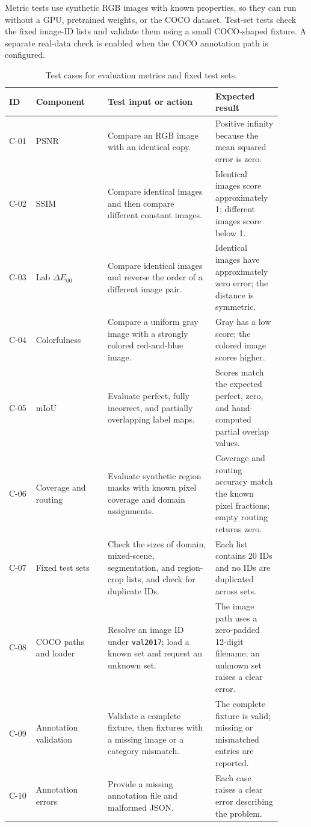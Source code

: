 \documentclass{FastFyp}
\begin{document}
Metric tests use synthetic RGB images with known properties, so they can run
without a GPU, pretrained weights, or the COCO dataset. Test-set tests check
the fixed image-ID lists and validate them using a small COCO-shaped fixture.
A separate real-data check is enabled when the COCO annotation path is
configured.

\begin{table}[htbp]
\centering
\caption{Test cases for evaluation metrics and fixed test sets.}
\label{tab:person-c-test-cases}
\begin{tabular}{p{0.09\linewidth}p{0.24\linewidth}p{0.36\linewidth}p{0.21\linewidth}}
\hline
ID & Component & Test input or action & Expected result\\
\hline
C-01 & PSNR & Compare an RGB image with an identical copy. & Positive infinity because the mean squared error is zero.\\
C-02 & SSIM & Compare identical images and then compare different constant images. & Identical images score approximately 1; different images score below 1.\\
C-03 & Lab $\Delta E_{00}$ & Compare identical images and reverse the order of a different image pair. & Identical images have approximately zero error; the distance is symmetric.\\
C-04 & Colorfulness & Compare a uniform gray image with a strongly colored red-and-blue image. & Gray has a low score; the colored image scores higher.\\
C-05 & mIoU & Evaluate perfect, fully incorrect, and partially overlapping label maps. & Scores match the expected perfect, zero, and hand-computed partial overlap values.\\
C-06 & Coverage and routing & Evaluate synthetic region masks with known pixel coverage and domain assignments. & Coverage and routing accuracy match the known pixel fractions; empty routing returns zero.\\
C-07 & Fixed test sets & Check the sizes of domain, mixed-scene, segmentation, and region-crop lists, and check for duplicate IDs. & Each list contains 20 IDs and no IDs are duplicated across sets.\\
C-08 & COCO paths and loader & Resolve an image ID under \texttt{val2017}; load a known set and request an unknown set. & The image path uses a zero-padded 12-digit filename; an unknown set raises a clear error.\\
C-09 & Annotation validation & Validate a complete fixture, then fixtures with a missing image or a category mismatch. & The complete fixture is valid; missing or mismatched entries are reported.\\
C-10 & Annotation errors & Provide a missing annotation file and malformed JSON. & Each case raises a clear error describing the problem.\\
\hline
\end{tabular}
\end{table}
\end{document}
